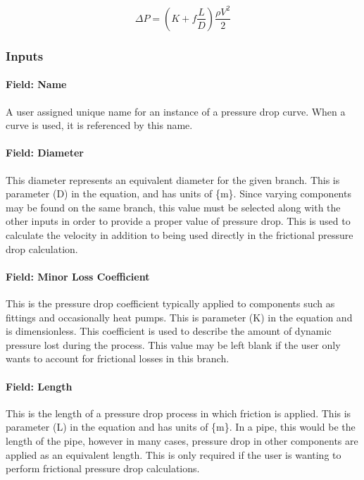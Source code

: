 \begin{equation}
\Delta P = \left( {K + f\frac{L}{D}} \right)\frac{{\rho {V^2}}}{2}
\end{equation}

\subsubsection{Inputs}\label{inputs-11-010}

\paragraph{Field: Name}\label{field-name-11-009}

A user assigned unique name for an instance of a pressure drop curve. When a curve is used, it is referenced by this name.

\paragraph{Field: Diameter}\label{field-diameter-000}

This diameter represents an equivalent diameter for the given branch. This is parameter (D) in the equation, and has units of \{m\}. Since varying components may be found on the same branch, this value must be selected along with the other inputs in order to provide a proper value of pressure drop. This is used to calculate the velocity in addition to being used directly in the frictional pressure drop calculation.

\paragraph{Field: Minor Loss Coefficient}\label{field-minor-loss-coefficient}

This is the pressure drop coefficient typically applied to components such as fittings and occasionally heat pumps. This is parameter (K) in the equation and is dimensionless. This coefficient is used to describe the amount of dynamic pressure lost during the process. This value may be left blank if the user only wants to account for frictional losses in this branch.

\paragraph{Field: Length}\label{field-length}

This is the length of a pressure drop process in which friction is applied. This is parameter (L) in the equation and has units of \{m\}. In a pipe, this would be the length of the pipe, however in many cases, pressure drop in other components are applied as an equivalent length. This is only required if the user is wanting to perform frictional pressure drop calculations.

